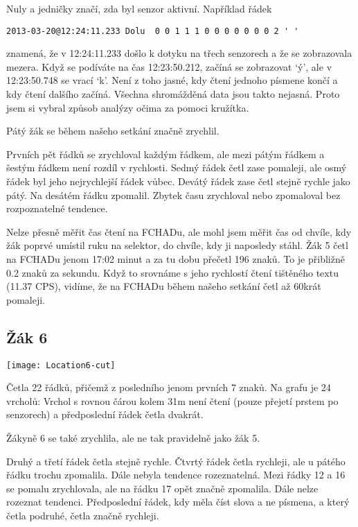 Nuly a jedničky značí, zda byl senzor aktivní. Například řádek
\begin{verbatim}
2013-03-20@12:24:11.233 Dolu  0 0 1 1 1 0 0 0 0 0 0 0 2 ' '
\end{verbatim}

znamená, že v 12:24:11.233 došlo k dotyku na třech senzorech a že se zobrazovala mezera.  Když se podíváte na čas 12:23:50.212, začíná se zobrazovat `ý', ale v 12:23:50.748 se vrací `k'.  Není z toho jasné, kdy čtení jednoho písmene končí a kdy čtení dalšího začíná.  Všechna shromážděná data jsou takto nejasná.  Proto jsem si vybral způsob analýzy očima za pomoci kružítka.

Pátý žák se během našeho setkání značně zrychlil.

Prvních pět řádků se zrychloval každým řádkem, ale mezi pátým řádkem a šestým řádkem není rozdíl v rychlosti. Sedmý řádek četl zase pomaleji, ale osmý řádek byl jeho nejrychlejší řádek vůbec. Devátý řádek zase četl stejně rychle jako pátý.  Na desátém řádku zpomalil.  Zbytek času zrychloval nebo zpomaloval bez rozpoznatelné tendence.

Nelze přesně měřit čas čtení na FCHADu, ale mohl jsem měřit čas od chvíle, kdy žák poprvé umístil ruku na selektor, do chvíle, kdy ji naposledy stáhl. Žák 5 četl na FCHADu jenom 17:02 minut a za tu dobu přečetl 196 znaků.  To je přibližně 0.2 znaků za sekundu. Když to srovnáme s jeho rychlostí čtení tištěného textu (11.37 CPS), vidíme, že na FCHADu během našeho setkání četl až 60krát pomaleji.

\subsection{Žák 6}
\texttt{[image: Location6-cut]}

Četla 22 řádků, přičemž z posledního jenom prvních 7 znaků.  Na grafu je 24 vrcholů: Vrchol s rovnou čárou kolem 31m není čtení (pouze přejetí prstem po senzorech) a předposlední řádek četla dvakrát.

Žákyně 6 se také zrychlila, ale ne tak pravidelně jako žák 5.

Druhý a třetí řádek četla stejně rychle.  Čtvrtý řádek četla rychleji, ale u pátého řádku trochu zpomalila. Dále nebyla tendence rozeznatelná.  Mezi řádky 12 a 16 se pomalu zrychlovala, ale na řádku 17 opět značně zpomalila.  Dále nelze rozeznat tendenci.  Předposlední řádek, kdy měla číst slova a ne písmena, a který četla podruhé, četla značně rychleji.

